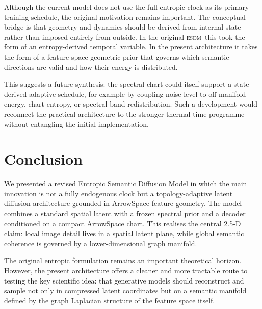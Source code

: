 \documentclass[11pt]{article}
\newcommand{\ESDM}{\textsc{esdm}}
\begin{document}
Although the current model does not use the full entropic clock as its primary
training schedule, the original motivation remains important. The conceptual
bridge is that geometry and dynamics should be derived from internal state
rather than imposed entirely from outside. In the original \ESDM~this took the
form of an entropy-derived temporal variable. In the present architecture it
takes the form of a feature-space geometric prior that governs which semantic
directions are valid and how their energy is distributed.

This suggests a future synthesis: the spectral chart could itself support a
state-derived adaptive schedule, for example by coupling noise level to
off-manifold energy, chart entropy, or spectral-band redistribution. Such a
development would reconnect the practical architecture to the stronger thermal
time programme without entangling the initial implementation.

\section{Conclusion}
\label{sec:conclusion}

We presented a revised Entropic Semantic Diffusion Model in which the main
innovation is not a fully endogenous clock but a topology-adaptive latent
diffusion architecture grounded in ArrowSpace feature geometry. The model
combines a standard spatial latent with a frozen spectral prior and a decoder
conditioned on a compact ArrowSpace chart. This realises the central 2.5-D
claim: local image detail lives in a spatial latent plane, while global
semantic coherence is governed by a lower-dimensional graph manifold.

The original entropic formulation remains an important theoretical horizon.
However, the present architecture offers a cleaner and more tractable route to
testing the key scientific idea: that generative models should reconstruct and
sample not only in compressed latent coordinates but on a semantic manifold
defined by the graph Laplacian structure of the feature space itself.
\end{document}
